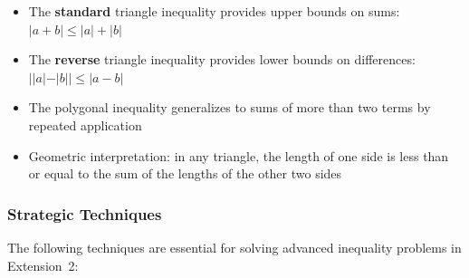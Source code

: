 \documentclass[12pt]{article}
\newenvironment{remark}[1][]{%
  \begin{remarkbox}[title={\bfseries Remark~\thetcbcounter\ifx\relax#1\relax\else\ (#1)\fi}]%
}{%
  \end{remarkbox}%
}
\begin{document}
\begin{remark}[Applications of Triangle Inequalities]
\begin{itemize}[leftmargin=*]
\item The \textbf{standard} triangle inequality provides upper bounds on sums: $|a+b| \le |a| + |b|$
\item The \textbf{reverse} triangle inequality provides lower bounds on differences: $||a|-|b|| \le |a-b|$
\item The polygonal inequality generalizes to sums of more than two terms by repeated application
\item Geometric interpretation: in any triangle, the length of one side is less than or equal to the sum of the lengths of the other two sides
\end{itemize}
\end{remark}

\subsubsection{Strategic Techniques}

The following techniques are essential for solving advanced inequality problems in Extension~2:
\end{document}
